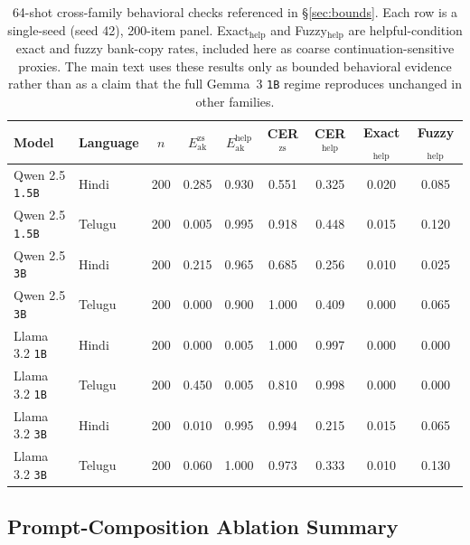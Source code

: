 \documentclass{article}
\begin{document}
\begin{table}[t]
\centering
\small
\setlength{\tabcolsep}{7pt}
\begin{tabular}{llccccccc}
\toprule
\textbf{Model} & \textbf{Language} & \textbf{$n$} & \textbf{$E_{\mathrm{ak}}^{\mathrm{zs}}$} & \textbf{$E_{\mathrm{ak}}^{\mathrm{help}}$} & \textbf{CER$^{\mathrm{zs}}$} & \textbf{CER$^{\mathrm{help}}$} & \textbf{Exact$_{\mathrm{help}}$} & \textbf{Fuzzy$_{\mathrm{help}}$} \\
\midrule
Qwen 2.5 \texttt{1.5B} & Hindi  & 200 & 0.285 & 0.930 & 0.551 & 0.325 & 0.020 & 0.085 \\
Qwen 2.5 \texttt{1.5B} & Telugu & 200 & 0.005 & 0.995 & 0.918 & 0.448 & 0.015 & 0.120 \\
Qwen 2.5 \texttt{3B}   & Hindi  & 200 & 0.215 & 0.965 & 0.685 & 0.256 & 0.010 & 0.025 \\
Qwen 2.5 \texttt{3B}   & Telugu & 200 & 0.000 & 0.900 & 1.000 & 0.409 & 0.000 & 0.065 \\
Llama 3.2 \texttt{1B}  & Hindi  & 200 & 0.000 & 0.005 & 1.000 & 0.997 & 0.000 & 0.000 \\
Llama 3.2 \texttt{1B}  & Telugu & 200 & 0.450 & 0.005 & 0.810 & 0.998 & 0.000 & 0.000 \\
Llama 3.2 \texttt{3B}  & Hindi  & 200 & 0.010 & 0.995 & 0.994 & 0.215 & 0.015 & 0.065 \\
Llama 3.2 \texttt{3B}  & Telugu & 200 & 0.060 & 1.000 & 0.973 & 0.333 & 0.010 & 0.130 \\
\bottomrule
\end{tabular}
\caption{64-shot cross-family behavioral checks referenced in \S\ref{sec:bounds}. Each row is a single-seed (seed 42), 200-item panel. Exact$_{\mathrm{help}}$ and Fuzzy$_{\mathrm{help}}$ are helpful-condition exact and fuzzy bank-copy rates, included here as coarse continuation-sensitive proxies. The main text uses these results only as bounded behavioral evidence rather than as a claim that the full Gemma~3 \texttt{1B} regime reproduces unchanged in other families.}
\label{tab:crossfamily}
\end{table}

\subsection{Prompt-Composition Ablation Summary}\label{app:promptcomp}
\end{document}
